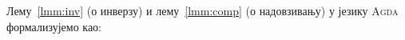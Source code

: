 Лему~\ref{lmm:inv} (о инверзу) и лему~\ref{lmm:comp} (о надовзивању) у језику \textsc{Agda} формализујемо као:
\begin{code}%
\>[0]\AgdaSpace{}%
\AgdaSymbol{:}\AgdaSpace{}%
\AgdaSymbol{\{}\AgdaSpace{}%
\AgdaSymbol{:}\AgdaSpace{}%
\AgdaSpace{}%
\AgdaSpace{}%
\AgdaSymbol{\}}\AgdaSpace{}%
\AgdaSymbol{\{}\AgdaSpace{}%
\AgdaSpace{}%
\AgdaSymbol{:}\AgdaSpace{}%
\AgdaSymbol{\}}\AgdaSpace{}%
\AgdaSpace{}%
\AgdaSpace{}%
\AgdaOperator{\AgdaFunction{==}}\AgdaSpace{}%
\AgdaSpace{}%
\AgdaSpace{}%
\AgdaSpace{}%
\AgdaOperator{\AgdaFunction{==}}\AgdaSpace{}%
\<%
\\
\>[0]\AgdaSymbol{(}\AgdaSpace{}%
\AgdaSymbol{)}\AgdaSpace{}%
\AgdaSpace{}%
\AgdaSymbol{=}\AgdaSpace{}%
\AgdaSpace{}%
\<%
\\
%
\\[\AgdaEmptyExtraSkip]%
\>[0]\AgdaSpace{}%
\AgdaSpace{}%
\<%
\\
%
\\[\AgdaEmptyExtraSkip]%
\>[0]\AgdaSpace{}%
\AgdaSymbol{:}\AgdaSpace{}%
\AgdaSymbol{\{}\AgdaSpace{}%
\AgdaSymbol{:}\AgdaSpace{}%
\AgdaSpace{}%
\AgdaSpace{}%
\AgdaSymbol{\}}\AgdaSpace{}%
\AgdaSymbol{\{}\AgdaSpace{}%
\AgdaSpace{}%
\AgdaSpace{}%
\AgdaSymbol{:}\AgdaSpace{}%
\AgdaSymbol{\}}\AgdaSpace{}%
\AgdaSpace{}%
\AgdaSpace{}%
\AgdaOperator{\AgdaFunction{==}}\AgdaSpace{}%
\AgdaSpace{}%
\AgdaSpace{}%
\AgdaSpace{}%
\AgdaOperator{\AgdaFunction{==}}\AgdaSpace{}%
\AgdaSpace{}%
\AgdaSpace{}%
\AgdaSpace{}%
\AgdaOperator{\AgdaFunction{==}}\AgdaSpace{}%
\<%
\\
\>[0]\AgdaSpace{}%
\AgdaSymbol{\AgdaUnderscore{}}\AgdaSpace{}%
\AgdaSpace{}%
\AgdaSpace{}%
\AgdaSymbol{=}\AgdaSpace{}%
\<%
\end{code}
